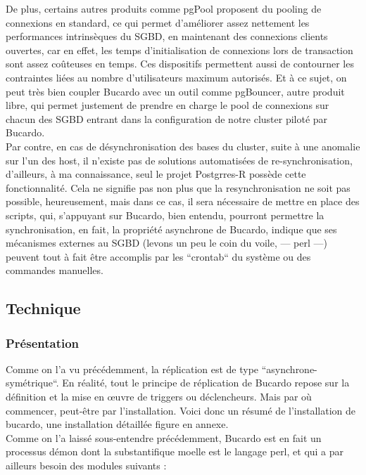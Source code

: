 \documentclass[12pt]{report}
\begin{document}
De plus, certains autres produits comme pgPool proposent du pooling de
connexions en standard, ce qui permet d'améliorer assez nettement les
performances intrinsèques du SGBD, en maintenant des connexions clients
ouvertes, car en effet, les temps d'initialisation de connexions lors de
transaction sont assez coûteuses en temps. Ces dispositifs permettent aussi de
contourner les contraintes liées au nombre d'utilisateurs maximum autorisés. Et
à ce sujet, on peut très bien coupler Bucardo avec un outil comme pgBouncer,
autre produit libre, qui permet justement de prendre en charge le pool de
connexions sur chacun des SGBD entrant dans la configuration de notre cluster
piloté par Bucardo. \\


Par contre, en cas de désynchronisation des bases du cluster, suite à une
anomalie sur l'un des host, il n'existe pas de solutions automatisées de
re-synchronisation, d'ailleurs, à ma connaissance, seul le projet Postgrres-R
possède cette fonctionnalité. Cela ne signifie pas non plus que la
resynchronisation ne soit pas possible, heureusement, mais dans ce cas, il sera
nécessaire de mettre en place des scripts, qui, s'appuyant sur Bucardo, bien
entendu, pourront permettre la synchronisation, en fait, la propriété asynchrone
de Bucardo, indique que ses mécanismes externes au SGBD (levons un peu le coin
du voile, — perl —) peuvent tout à fait être accomplis par les “crontab“ du
système ou des commandes manuelles.


\subsection{Technique}

\subsubsection{Présentation}

Comme on l'a vu précédemment, la réplication est de type
“asynchrone-symétrique“. En réalité, tout le principe de réplication de Bucardo
repose sur la définition et la mise en œuvre de triggers ou déclencheurs. Mais
par où commencer, peut-être par l'installation. Voici donc un résumé de
l'installation de bucardo, une installation détaillée figure en annexe. \\

Comme on l'a laissé sous-entendre précédemment, Bucardo est en fait un processus
démon dont la substantifique moelle est le langage perl, et qui a par ailleurs
besoin des modules suivants : \\
\end{document}
